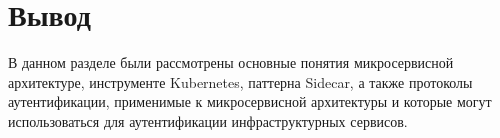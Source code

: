 \section*{Вывод}
В данном разделе были рассмотрены основные понятия микросервисной архитектуре, инструменте Kubernetes, паттерна Sidecar, а также протоколы аутентификации, применимые к микросервисной архитектуры и которые могут использоваться для аутентификации инфраструктурных сервисов.

